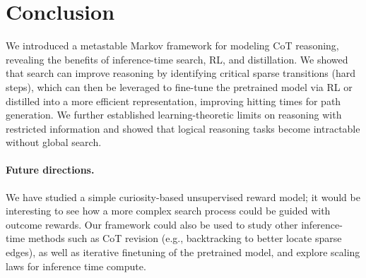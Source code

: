 \section{Conclusion}

We introduced a metastable Markov framework for modeling CoT reasoning, revealing the benefits of inference-time search, RL, and distillation. We showed that search can improve reasoning by identifying critical sparse transitions (hard steps), which can then be leveraged to fine-tune the pretrained model via RL or distilled into a more efficient representation, improving hitting times for path generation. We further established learning-theoretic limits on reasoning with restricted information and showed that logical reasoning tasks become intractable without global search.

\paragraph{Future directions.} We have studied a simple curiosity-based unsupervised reward model; it would be interesting to see how a more complex search process could be guided with outcome rewards. Our framework could also be used to study other inference-time methods such as CoT revision (e.g., backtracking to better locate sparse edges), as well as iterative finetuning of the pretrained model, and explore scaling laws for inference time compute.